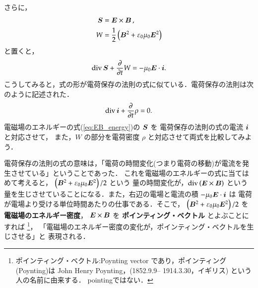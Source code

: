         さらに，
                \begin{align}
                        \boldsymbol{S} &= \boldsymbol{E}\times\boldsymbol{B} \,,\,\\
                        W   &= \frac{1}{2} \left(\boldsymbol{B}^{2}+\varepsilon_{0}\mu_{0}\boldsymbol{E}^{2}\right)
                \end{align}
        と置くと，
            \begin{align}\label{eq:EB_energy}
                \ddiv \bS + \frac{\rd}{\rd t} W = -\mu_{0}\bE\cdot\bi.
            \end{align}
        こうしてみると，式の形が電荷保存の法則の式に似ている．電荷保存の法則は次のように記述された．
            \begin{align}
                 \mathrm{div}\,\boldsymbol{i} + \frac{\partial }{\partial t} \rho = 0.
            \end{align}
        電磁場のエネルギーの式(\ref{eq:EB_energy})の $\boldsymbol{S}$ を
        電荷保存の法則の式の電流 $\boldsymbol{i}$ と対応させて，
        また，$W$ の部分を電荷密度 $\rho$ と対応させて両式を比較してみよう．

        電荷保存の法則の式の意味は，「電荷の時間変化(つまり電荷の移動)が電流を発生させている」ということであった．
        これを電磁場のエネルギーの式に当てはめて考えると，
        $\left(\boldsymbol{B}^{2}+\varepsilon_{0}\mu_{0}\boldsymbol{E}^{2}\right)/2$ という
        量の時間変化が，$\mathrm{div}\,(\boldsymbol{E}\times\boldsymbol{B})$ という
        量を生じさせていることになる．また，右辺の電場と電流の積 $-\mu_{0}\boldsymbol{E}\cdot\boldsymbol{i}$ は
        電荷が電場より受ける単位時間あたりの仕事である．そこで，
        $\left(\boldsymbol{B}^{2}+\varepsilon_{0}\mu_{0}\boldsymbol{E}^{2}\right)/2$ を \textbf{電磁場のエネルギー密度}，
        $\boldsymbol{E}\times\boldsymbol{B}$ を \textbf{ポインティング・ベクトル} とよぶことにすれば
            \footnote{
                ポインティング・ベクトル:\;Poynting vector であり，ポインティング(Poynting)は
                John Henry Poynting，(1852.9.9-- 1914.3.30，イギリス)
                という人の名前に由来する．
                pointingではない．
            }，
        「電磁場のエネルギー密度の変化が，ポインティング・ベクトルを生じさせる」と
        表現される．


